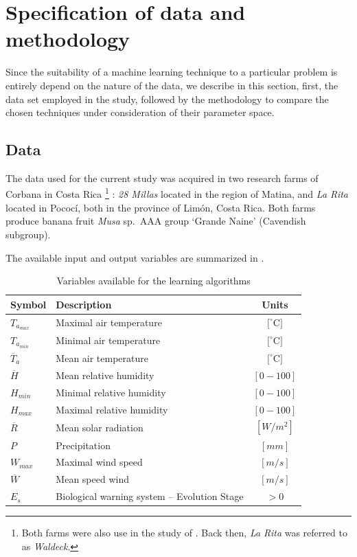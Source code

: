 \section{Specification of data and methodology}
\label{sec:data}

Since the suitability of a machine learning technique to a particular
problem is entirely depend on the nature of the data, we describe in
this section, first, the data set employed in the study, followed by
the methodology to compare the chosen techniques under consideration
of their parameter space.

\subsection{Data}

The data used for the current study was acquired in two research farms
of Corbana in Costa Rica%
%
\footnote{Both farms were also use in the study of \citet{Romero1995}.  Back
  then, \emph{La Rita} was referred to as \emph{Waldeck}.}
%
: \emph{28 Millas} located in the region of Matina, and \emph{La Rita}
located in Pococí, both in the province of Limón, Costa Rica.
%
Both farms produce banana fruit \emph{Musa} sp.\ AAA group `Grande
Naine' (Cavendish subgroup). 

The available input and output variables are summarized in
.
%
\begin{table}[h] 
\centering
\begin{tabular}{l|l|c} 
\hline
\textbf{Symbol}  & \textbf{Description} & \textbf{Units} \\ 
\hline\hline 
$T_{a_{max}}$       & Maximal air temperature & $[^\circ$C$]$ \\
$T_{a_{min}}$       & Minimal air temperature & $[^\circ$C$]$ \\
$\overline{T}_{a}$ & Mean air temperature    & $[^\circ$C$]$ \\
$\overline{H}$    & Mean relative humidity           & $[0 - 100]$   \\
$H_{min}$          & Minimal relative humidity        & $[0 - 100]$  \\
$H_{max}$          & Maximal relative humidity        & $[0 - 100]$  \\
$\overline{R}$    & Mean solar radiation    & $[W/m^2]$ \\
$P$               & Precipitation       & $[mm]$ \\
$W_{max}$          & Maximal wind speed      & $[m/s]$ \\
$\overline{W}$    & Mean speed wind         & $[m/s]$ \\
\hline
$E_s$             & Biological warning system – Evolution Stage  & $>0$\\
\hline
\end{tabular} 
\caption{Variables available for the learning algorithms} 
\label{tab:variables} 
\end{table}


